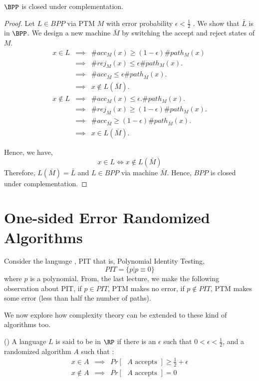\begin{proposition}
$\BPP$ is closed under complementation.
\end{proposition}
\begin{proof}
Let $L \in BPP$ via PTM $M$ with error probability $\epsilon < \frac{1}{2}$ . We show that $\bar L$ is in $\BPP$.
We design a new machine $\bar M$ by switching the accept and reject states of $M$.
\begin{eqnarray*}
x \in L & \implies & \#acc_M(x) \geq (1 - \epsilon )\#path_M(x) \\
& \implies & \#rej_M(x) \leq \epsilon \#path_M(x). \\
& \implies & \#acc_{\bar M} \leq \epsilon \#path_{\bar M}(x). \\
& \implies & x \notin L(\bar M). \\
x \notin L & \implies & \#acc_M(x) \leq \epsilon.\#path_M(x). \\
& \implies & \#rej_M(x) \geq (1-\epsilon)\#path_M(x). \\
& \implies & \#acc_{\bar M} \geq (1-\epsilon) \#path_{\bar M}(x).\\
& \implies & x \in L(\bar M).
\end{eqnarray*}

Hence, we have,
\[x\in L \iff x\notin L(\bar M) \]
Therefore, $L(\bar M) = \bar L$ and $L \in BPP$ via machine $\bar M$. Hence,
$BPP$ is closed under complementation.
\end{proof}


\section*{One-sided Error Randomized Algorithms}

Consider the language , PIT that is, Polynomial Identity Testing,
\[PIT =\{ p |  p\equiv 0 \}\] where $p$ is a polynomial.
From, the last lecture, we make the following observation about PIT,
if $p \in PIT$, PTM makes no error,
if $p \notin PIT$, PTM makes some error (less than half the number of paths).

We now explore how complexity theory can be extended to these kind of algorithms too.
\begin{definition}({\bf \RP})
A language $L$ is said to be in $\RP$ if there is an $\epsilon$ such
that $0 < \epsilon < \frac{1}{2}$, and a randomized algorithm $A$ such that :
\begin{eqnarray*}
x \in A & \implies & Pr [\textrm{ $A$ accepts }] \ge \frac{1}{2}+\epsilon \\
x \notin A & \implies & Pr [\textrm{ $A$ accepts }] = 0
\end{eqnarray*}
\end{definition}

